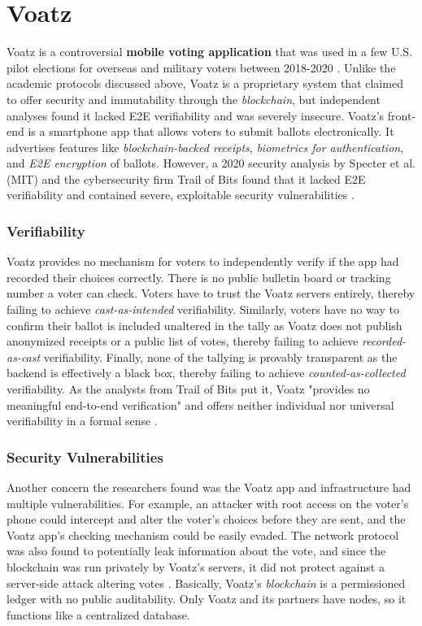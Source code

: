 \section{Voatz}
Voatz is a controversial \textbf{mobile voting application} that was used in a few U.S. pilot elections for overseas and military voters between 2018-2020 \cite{voatz-mobile-voting-2020}. 
Unlike the academic protocols discussed above, Voatz is a proprietary system that claimed to offer security and immutability through the \emph{blockchain}, but independent analyses found it lacked E2E verifiability and was severely insecure.
Voatz's front-end is a smartphone app that allows voters to submit ballots electronically.
It advertises features like \emph{blockchain-backed receipts}, \emph{biometrics for authentication}, and \emph{E2E encryption} of ballots.
However, a 2020 security analysis by Specter et al. (MIT) and the cybersecurity firm Trail of Bits found that it lacked E2E verifiability and contained severe, exploitable security vulnerabilities \cite{specter2020ballot,guido2020our}.

\subsubsection{Verifiability}
Voatz provides no mechanism for voters to independently verify if the app had recorded their choices correctly.
There is no public bulletin board or tracking number a voter can check. 
Voters have to trust the Voatz servers entirely, thereby failing to achieve \emph{cast-as-intended} verifiability.
Similarly, voters have no way to confirm their ballot is included unaltered in the tally as Voatz does not publish anonymized receipts or a public list of votes, thereby failing to achieve \emph{recorded-as-cast} verifiability.
Finally, none of the tallying is provably transparent as the backend is effectively a black box, thereby failing to achieve \emph{counted-as-collected} verifiability.
As the analysts from Trail of Bits put it, Voatz "provides no meaningful end-to-end verification" and offers neither individual nor universal verifiability in a formal sense \cite{trailofbits-voatz-2020}.


\subsubsection{Security Vulnerabilities}
Another concern the researchers found was the Voatz app and infrastructure had multiple vulnerabilities. 
For example, an attacker with root access on the voter's phone could intercept and alter the voter's choices before they are sent, and the Voatz app's checking mechanism could be easily evaded. 
The network protocol was also found to potentially leak information about the vote, and since the blockchain was run privately by Voatz's servers, it did not protect against a server-side attack altering votes \cite{statescoop-voatz-audit-2020}. 
Basically, Voatz's \emph{blockchain} is a permissioned ledger with no public auditability.
Only Voatz and its partners have nodes, so it functions like a centralized database. 

